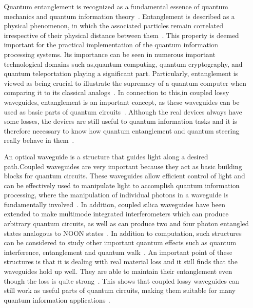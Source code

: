 Quantum entanglement is recognized as a fundamental essence of quantum mechanics and quantum information theory~\cite{Horodecki2009}. Entanglement is described as a physical phenomenon, in which the associated particles remain correlated irrespective of their physical distance between them~\cite{EinsteinPodolskyRosen1935}. This property is deemed important for the practical implementation of the quantum information processing systems. Its importance can be seen in numerous important technological domains such as,quantum computing, quantum cryptography, and quantum teleportation playing a significant part\cite{NielsenChuang2000,Horodecki2009}. Particularly, entanglement is viewed as being crucial to illustrate the supremacy of a quantum computer when comparing it to its classical analogs~\cite{JozsaLinden2003}.
In connection to this,in coupled lossy waveguides, entanglement is an important concept, as these waveguides can be used as basic parts of quantum circuits~\cite{Politi2008,Peruzzo2010,Crespi2013}. Although the real devices always have some losses, the devices are still useful to quantum information tasks and it is therefore necessary to know how quantum entanglement and quantum steering really behave in them~\cite{BreuerPetruccione2002,Rai2010,Horodecki2009}.

An optical waveguide is a structure that guides light along a desired path.Coupled waveguides are very important because they act as basic building blocks for quantum circuits. These waveguides allow efficient control of light and can be effectively used to manipulate light to accomplish quantum information processing, where the manipulation of individual photons in a waveguide is fundamentally involved~\cite{Politi2008,OBrien2009,Peruzzo2010}. In addition, coupled silica waveguides have been extended to make multimode integrated interferometers which can produce arbitrary quantum circuits, as well as can produce two and four photon entangled states analogous to NOON states~\cite{Crespi2013,Politi2008,Matthews2009}. In addition to computation, such structures can be considered to study other important quantum effects such as quantum interference, entanglement and quantum walk~\cite{Peruzzo2010,Bromberg2009,OBrien2009}. An important point of these structures is that it is dealing with real material loss and it still finds that the waveguides hold up well. They are able to maintain their entanglement even though the loss is quite strong~\cite{Rai2010}. This shows that coupled lossy waveguides can still work as useful parts of quantum circuits, making them suitable for many quantum information applications~\cite{Rai2010,Weedbrook2012}.


